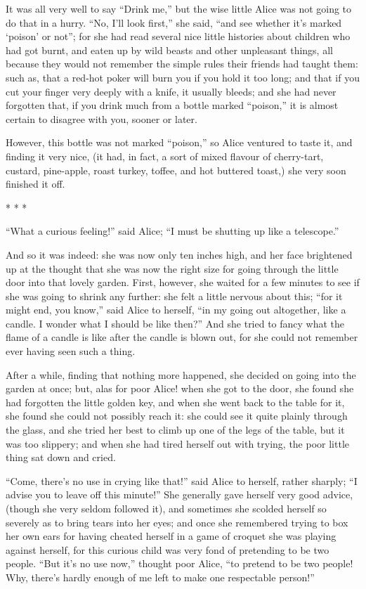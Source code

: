 \documentclass[10pt]{article}
\begin{document}
It was all very well to say ``Drink me,'' but the wise little Alice was not going to do that in a hurry. ``No, I'll look first,'' she said, ``and see whether it's marked ‘poison' or not''; for she had read several nice little histories about children who had got burnt, and eaten up by wild beasts and other unpleasant things, all because they would not remember the simple rules their friends had taught them: such as, that a red-hot poker will burn you if you hold it too long; and that if you cut your finger very deeply with a knife, it usually bleeds; and she had never forgotten that, if you drink much from a bottle marked ``poison,'' it is almost certain to disagree with you, sooner or later.

However, this bottle was not marked ``poison,'' so Alice ventured to taste it, and finding it very nice, (it had, in fact, a sort of mixed flavour of cherry-tart, custard, pine-apple, roast turkey, toffee, and hot buttered toast,) she very soon finished it off.

\begin{center}
    * * * 
\end{center}

``What a curious feeling!'' said Alice; ``I must be shutting up like a telescope.''

And so it was indeed: she was now only ten inches high, and her face brightened up at the thought that she was now the right size for going through the little door into that lovely garden. First, however, she waited for a few minutes to see if she was going to shrink any further: she felt a little nervous about this; ``for it might end, you know,'' said Alice to herself, ``in my going out altogether, like a candle. I wonder what I should be like then?'' And she tried to fancy what the flame of a candle is like after the candle is blown out, for she could not remember ever having seen such a thing.

After a while, finding that nothing more happened, she decided on going into the garden at once; but, alas for poor Alice! when she got to the door, she found she had forgotten the little golden key, and when she went back to the table for it, she found she could not possibly reach it: she could see it quite plainly through the glass, and she tried her best to climb up one of the legs of the table, but it was too slippery; and when she had tired herself out with trying, the poor little thing sat down and cried.

``Come, there's no use in crying like that!'' said Alice to herself, rather sharply; ``I advise you to leave off this minute!'' She generally gave herself very good advice, (though she very seldom followed it), and sometimes she scolded herself so severely as to bring tears into her eyes; and once she remembered trying to box her own ears for having cheated herself in a game of croquet she was playing against herself, for this curious child was very fond of pretending to be two people. ``But it's no use now,'' thought poor Alice, ``to pretend to be two people! Why, there's hardly enough of me left to make one respectable person!''
\end{document}

